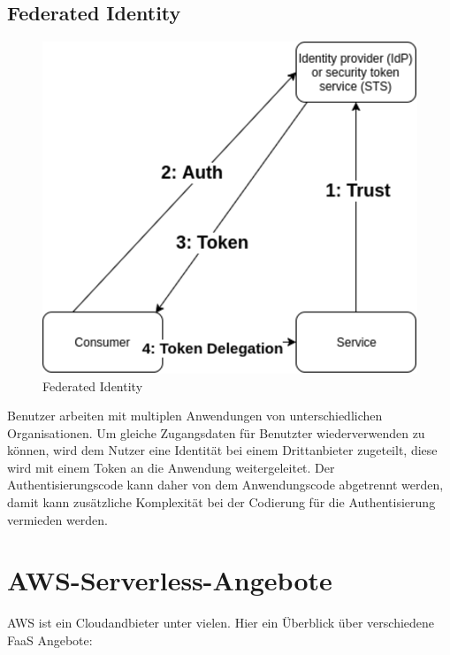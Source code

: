 \documentclass[
12pt,
english,
ngerman,
headsepline,
twoside,
openright,
numbers=noenddot,version=first
]{scrreprt}
\begin{document}
\section{Federated Identity}\label{sec:federated-identity}
\begin{figure}[H]
	\centering
\includegraphics[scale=0.60]{./pics/pattern-federated-identity.eps}
\caption{Federated Identity}
\label{pic:federated-identity}
\end{figure}
Benutzer arbeiten mit multiplen Anwendungen von unterschiedlichen Organisationen. Um gleiche Zugangsdaten für Benutzter wiederverwenden zu können, wird dem Nutzer eine Identität bei einem Drittanbieter zugeteilt, diese wird mit einem Token an die Anwendung weitergeleitet. Der Authentisierungscode kann daher von dem Anwendungscode abgetrennt werden, damit kann zusätzliche Komplexität bei der Codierung für die Authentisierung vermieden werden.

\chapter{AWS-Serverless-Angebote}
\label{chap:aws-serverless}
\acrshort{AWS} ist ein Cloudandbieter unter vielen.
Hier ein Überblick über verschiedene \acrshort{FaaS} Angebote:\\
\end{document}
